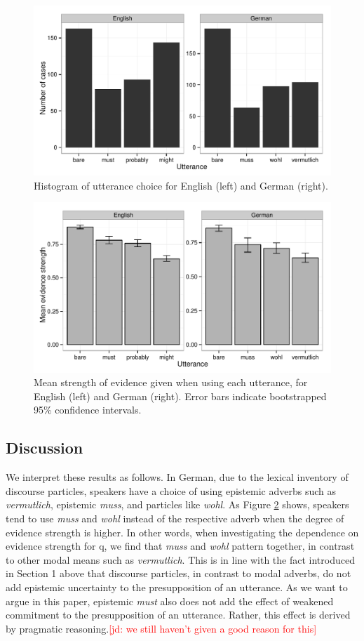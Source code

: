 \documentclass[11pt]{article}
\newcommand{\jd}[1]{\textcolor{Red}{[jd: #1]}}
\newcommand{\figref}[1]{Figure \ref{#1}}
\begin{document}
\begin{figure}
\centering
\includegraphics[width=.9\textwidth]{pics/production-distribution}
\caption{Histogram of utterance choice for English (left) and German (right).}
\label{fig:utterances}
\end{figure}

\begin{figure}
\centering
\includegraphics[width=.9\textwidth]{pics/mean-production-evidence}
\caption{Mean strength of evidence given when using each utterance, for English (left) and German (right). Error bars indicate bootstrapped 95\% confidence intervals.}
\label{fig:utterances-estrength}
\end{figure}


\subsection{Discussion}
We interpret these results as follows. In German, due to the lexical inventory of discourse particles, speakers have a choice of using epistemic adverbs such as \emph{vermutlich}, epistemic \emph{muss}, and particles like \emph{wohl}. As \figref{fig:utterances-estrength} shows, speakers tend to use \emph{muss} and \emph{wohl} instead of the respective adverb when the degree of evidence strength is higher. In other words, when investigating the dependence on evidence strength for q, we find that \emph{muss} and \emph{wohl} pattern together, in contrast to other modal means such as \emph{vermutlich}. This is in line with the fact introduced in Section 1 above that discourse particles, in contrast to modal adverbs, do not add epistemic uncertainty to the presupposition of an utterance. As we want to argue in this paper, epistemic \emph{must} also does not add the effect of weakened commitment to the presupposition of an utterance. Rather, this effect is derived by pragmatic reasoning.\jd{we still haven't given a good reason for this}
\end{document}
